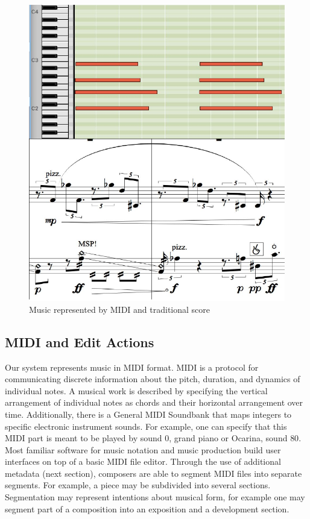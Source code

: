 \documentclass[final,authoryear,5p,times,twocolumn]{elsarticle}
\begin{document}
\begin{figure}
	\centering
	\includegraphics[scale=0.5]{midi.pdf}
	\caption{Music represented by MIDI and traditional score}
	\label{fig:midi}
\end{figure}

\subsection{MIDI and Edit Actions}

Our system represents music in MIDI format. MIDI is a protocol for communicating discrete information about the pitch, duration, and dynamics of individual notes. A musical work is described by specifying the vertical arrangement of individual notes as chords and their horizontal arrangement over time. Additionally, there is a General MIDI Soundbank that maps integers to specific electronic instrument sounds. For example, one can specify that this MIDI part is meant to be played by sound $0$, grand piano or Ocarina, sound $80$. Most familiar software for music notation and music production build user interfaces on top of a basic MIDI file editor. Through the use of additional metadata (next section), composers are able to segment MIDI files into separate segments. For example, a piece may be subdivided into several sections. Segmentation may represent intentions about musical form, for example one may segment part of a composition into an exposition and a development section. 
\end{document}
